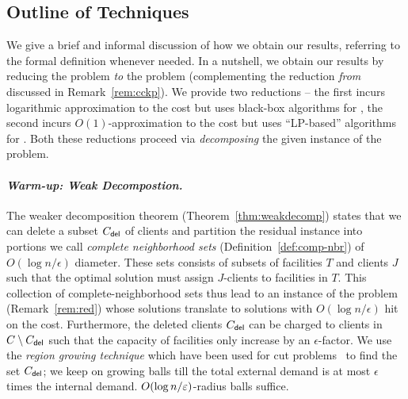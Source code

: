 %
%

\subsection{Outline of Techniques} \label{sec:overview}
We give a brief and informal discussion of how we obtain our results, referring to the formal definition whenever needed.
In a nutshell, we obtain our results by reducing the \mckc problem {\em to} the \cckp problem (complementing the reduction {\em from} discussed in Remark~\ref{rem:cckp}).
We provide two reductions -- the first incurs logarithmic approximation to the cost but uses black-box algorithms for \cckp, the second incurs $O(1)$-approximation to the cost but uses ``LP-based'' algorithms for \cckp.
Both these reductions proceed via {\em decomposing} the given instance of the \mckc problem. %

\paragraph{\emph{Warm-up: Weak Decompostion.}}
The weaker decomposition theorem (Theorem~\ref{thm:weakdecomp}) states that we can delete a subset $C_{\mathsf{del}}$ of clients and partition the residual instance into portions we call {\em complete neighborhood sets} (Definition~\ref{def:comp-nbr}) of $O(\log n/\epsilon)$ diameter.
These sets consists of subsets of facilities $T$ and clients $J$ such that the optimal solution must assign $J$-clients to facilities in $T$. This collection of complete-neighborhood sets thus lead to an instance of the \cckp problem (Remark~\ref{rem:red})
whose solutions translate to \mckc solutions with $O(\log n/\epsilon)$ hit on the cost. Furthermore, the deleted clients $C_{\mathsf{del}}$ can be charged to clients in $C\setminus C_{\mathsf{del}}$ such that the capacity of facilities only increase by an $\epsilon$-factor.
We use the {\em region growing technique} which have been used for cut problems~\cite{LeightonR99,GargVY96} to find the set $C_{\mathsf{del}}$; we keep on growing balls till the total external demand is at most $\epsilon$ times the internal demand.
$O(\log n/\varepsilon)$-radius balls suffice. %

